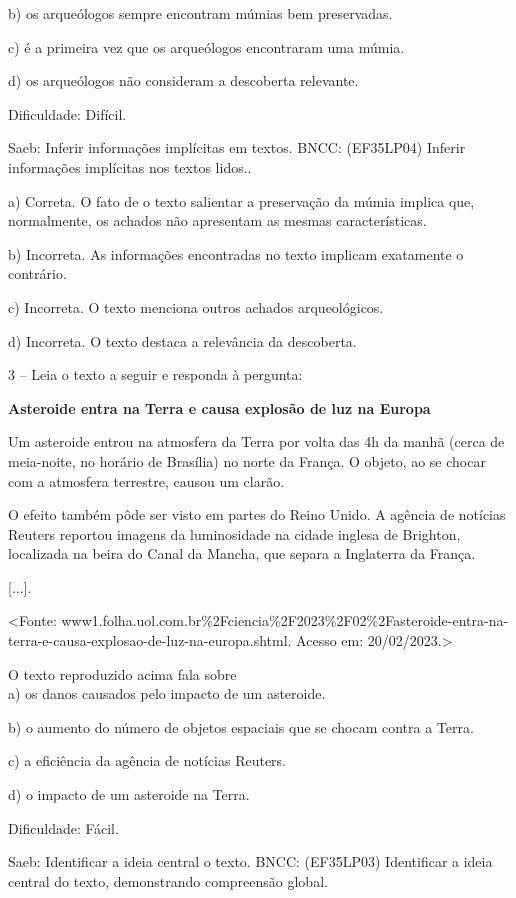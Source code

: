b) os arqueólogos sempre encontram múmias bem preservadas.

c) é a primeira vez que os arqueólogos encontraram uma múmia.

d) os arqueólogos não consideram a descoberta relevante.

Dificuldade: Difícil.

Saeb: Inferir informações implícitas em textos. BNCC: (EF35LP04) Inferir
informações implícitas nos textos lidos..

a) Correta. O fato de o texto salientar a preservação da múmia implica
que, normalmente, os achados não apresentam as mesmas características.

b) Incorreta. As informações encontradas no texto implicam exatamente o
contrário.

c) Incorreta. O texto menciona outros achados arqueológicos.

d) Incorreta. O texto destaca a relevância da descoberta.

3 -- Leia o texto a seguir e responda à pergunta:

\textbf{Asteroide entra na Terra e causa explosão de luz na Europa}

Um asteroide entrou na atmosfera da Terra por volta das 4h da manhã
(cerca de meia-noite, no horário de Brasília) no norte da França. O
objeto, ao se chocar com a atmosfera terrestre, causou um clarão.

O efeito também pôde ser visto em partes do Reino Unido. A agência de
notícias Reuters reportou imagens da luminosidade na cidade inglesa de
Brighton, localizada na beira do Canal da Mancha, que separa a
Inglaterra da França.

{[}...{]}.

\textless{}Fonte:
www1.folha.uol.com.br\%2Fciencia\%2F2023\%2F02\%2Fasteroide-entra-na-terra-e-causa-explosao-de-luz-na-europa.shtml.
Acesso em: 20/02/2023.\textgreater{}

O texto reproduzido acima fala sobre\\
a) os danos causados pelo impacto de um asteroide.

b) o aumento do número de objetos espaciais que se chocam contra a
Terra.

c) a eficiência da agência de notícias Reuters.

d) o impacto de um asteroide na Terra.

Dificuldade: Fácil.

Saeb: Identificar a ideia central o texto. BNCC: (EF35LP03) Identificar
a ideia central do texto, demonstrando compreensão global.

